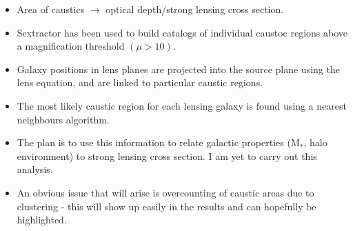 \documentclass{beamer}
\begin{document}
  \begin{frame}
    \begin{itemize}
      \item Area of caustics $\rightarrow$ optical depth/strong lensing cross section.
      \item Sextractor has been used to build catalogs of individual caustoc regions above a magnification threshold $\left( \mu > 10 \right)$.
      \item Galaxy positions in lens planes are projected into the source plane using the lens equation, and are linked to particular caustic regions.
      \item The most likely caustic region for each lensing galaxy is found using a nearest neighbours algorithm.
    \end{itemize}
  \end{frame}

  \begin{frame}
    \begin{itemize}
      \item The plan is to use this information to relate galactic properties (M$_{*}$, halo environment) to strong lensing cross section. I am yet to carry out this analysis.
      \item An obvious issue that will arise is overcounting of caustic areas due to clustering - this will show up easily in the results and can hopefully be highlighted.
    \end{itemize}
  \end{frame}
\end{document}
